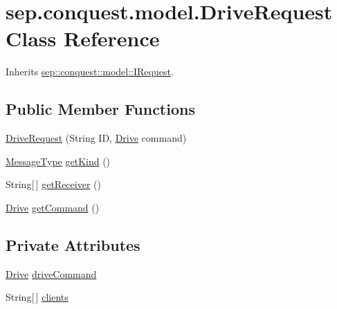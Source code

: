 \hypertarget{classsep_1_1conquest_1_1model_1_1_drive_request}{
\section{sep.conquest.model.DriveRequest Class Reference}
\label{classsep_1_1conquest_1_1model_1_1_drive_request}
}


Inherits \hyperlink{interfacesep_1_1conquest_1_1model_1_1_i_request}{sep::conquest::model::IRequest}.

\subsection*{Public Member Functions}
\begin{DoxyCompactItemize}
\item 
\hyperlink{classsep_1_1conquest_1_1model_1_1_drive_request_a12d9d9b3f14c426386568b88d11a18ce}{DriveRequest} (String ID, \hyperlink{namespacesep_1_1conquest_1_1model_ad9908b97350fd824462db2d10c17794c}{Drive} command)
\item 
\hyperlink{namespacesep_1_1conquest_1_1model_a9d4115ef068e2fe4bc233f43008aa095}{MessageType} \hyperlink{classsep_1_1conquest_1_1model_1_1_drive_request_abf97103a289cba2ebcb417c9141402bb}{getKind} ()
\item 
String\mbox{[}$\,$\mbox{]} \hyperlink{classsep_1_1conquest_1_1model_1_1_drive_request_ac182e73be128d0caf602d12405747cf3}{getReceiver} ()
\item 
\hyperlink{namespacesep_1_1conquest_1_1model_ad9908b97350fd824462db2d10c17794c}{Drive} \hyperlink{classsep_1_1conquest_1_1model_1_1_drive_request_a969d84b84f25e05a1ab9d111045259f1}{getCommand} ()
\end{DoxyCompactItemize}
\subsection*{Private Attributes}
\begin{DoxyCompactItemize}
\item 
\hyperlink{namespacesep_1_1conquest_1_1model_ad9908b97350fd824462db2d10c17794c}{Drive} \hyperlink{classsep_1_1conquest_1_1model_1_1_drive_request_a9a957adc86e4e4ca930084715ea93ebc}{driveCommand}
\item 
String\mbox{[}$\,$\mbox{]} \hyperlink{classsep_1_1conquest_1_1model_1_1_drive_request_a2f687bbf8761c850b1fae3f6050211b6}{clients}
\end{DoxyCompactItemize}


